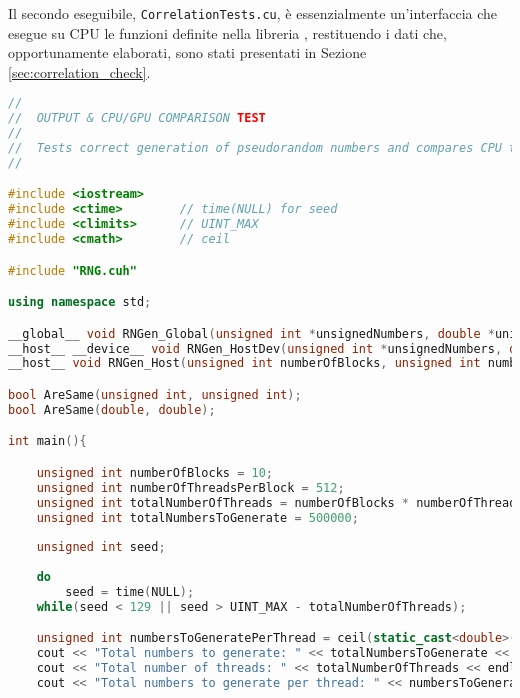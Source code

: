 Il secondo eseguibile, \verb|CorrelationTests.cu|, è essenzialmente un'interfaccia che esegue su CPU le funzioni definite nella libreria , restituendo i dati che, opportunamente elaborati, sono stati presentati in Sezione \ref{sec:correlation_check}.

\begin{lstlisting}[language=C++, caption={\texttt{libraries/CoreLibraries/RandomGenerator/OutputTest.cu}}]
//
//	OUTPUT & CPU/GPU COMPARISON TEST
//
//	Tests correct generation of pseudorandom numbers and compares CPU to GPU output with same seed.
//

#include <iostream>
#include <ctime>		// time(NULL) for seed
#include <climits>		// UINT_MAX
#include <cmath>		// ceil

#include "RNG.cuh"

using namespace std;

__global__ void RNGen_Global(unsigned int *unsignedNumbers, double *uniformNumbers, double *gaussianNumbers, double *bimodalNumbers, unsigned int totalNumbersToGenerate, unsigned int numbersToGeneratePerThread, unsigned int seed);
__host__ __device__ void RNGen_HostDev(unsigned int *unsignedNumbers, double *uniformNumbers, double *gaussianNumbers, double *bimodalNumbers, unsigned int totalNumbersToGenerate, unsigned int numbersToGeneratePerThread, unsigned int seed, unsigned int threadNumber);
__host__ void RNGen_Host(unsigned int numberOfBlocks, unsigned int numberOfThreadsPerBlock, unsigned int *unsignedNumbers, double *uniformNumbers, double *gaussianNumbers, double *bimodalNumbers, unsigned int totalNumbersToGenerate, unsigned int numbersToGeneratePerThread, unsigned int seed);

bool AreSame(unsigned int, unsigned int);
bool AreSame(double, double);

int main(){

	unsigned int numberOfBlocks = 10;
	unsigned int numberOfThreadsPerBlock = 512;
	unsigned int totalNumberOfThreads = numberOfBlocks * numberOfThreadsPerBlock;
	unsigned int totalNumbersToGenerate = 500000;
	
	unsigned int seed;	
	
	do
		seed = time(NULL);
	while(seed < 129 || seed > UINT_MAX - totalNumberOfThreads);

	unsigned int numbersToGeneratePerThread = ceil(static_cast<double>(totalNumbersToGenerate) / totalNumberOfThreads);
	cout << "Total numbers to generate: " << totalNumbersToGenerate << endl;
	cout << "Total number of threads: " << totalNumberOfThreads << endl;
	cout << "Total numbers to generate per thread: " << numbersToGeneratePerThread << endl;


\end{lstlisting}
